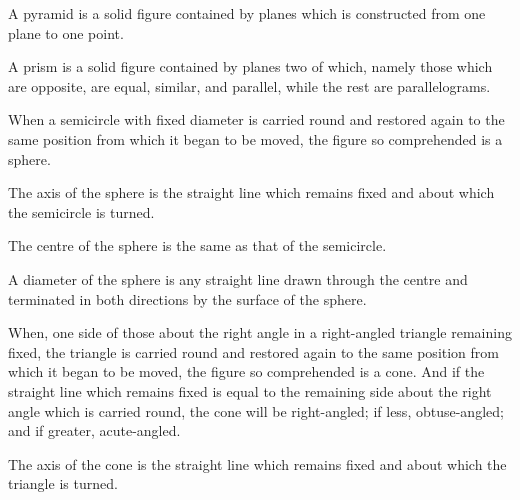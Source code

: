 \documentclass{rrxiv}
\begin{document}
\begin{scope}
\label{def:XI.12}
A pyramid is a solid figure contained by planes which is constructed
from one plane to one point.
\end{scope}

\begin{scope}
\label{def:XI.13}
A prism is a solid figure contained by planes two of which, namely
those which are opposite, are equal, similar, and parallel, while the
rest are parallelograms.
\end{scope}

\begin{scope}
\label{def:XI.14}
When a semicircle with fixed diameter is carried round and restored
again to the same position from which it began to be moved, the
figure so comprehended is a sphere.
\end{scope}

\begin{scope}
\label{def:XI.15}
The axis of the sphere is the straight line which remains fixed and
about which the semicircle is turned.
\end{scope}

\begin{scope}
\label{def:XI.16}
The centre of the sphere is the same as that of the semicircle.
\end{scope}

\begin{scope}
\label{def:XI.17}
A diameter of the sphere is any straight line drawn through the
centre and terminated in both directions by the surface of the sphere.
\end{scope}

\begin{scope}
\label{def:XI.18}
When, one side of those about the right angle in a right-angled
triangle remaining fixed, the triangle is carried round and restored
again to the same position from which it began to be moved, the
figure so comprehended is a cone.  And if the straight line which
remains fixed is equal to the remaining side about the right angle
which is carried round, the cone will be right-angled; if less,
obtuse-angled; and if greater, acute-angled.
\end{scope}

\begin{scope}
\label{def:XI.19}
The axis of the cone is the straight line which remains fixed and
about which the triangle is turned.
\end{scope}
\end{document}
